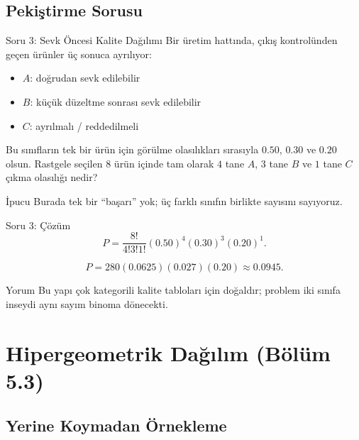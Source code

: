 \documentclass[light]{lutbeamer}
\begin{document}
\subsection{Pekiştirme Sorusu}

\begin{frame}{Soru 3: Sevk Öncesi Kalite Dağılımı}
    \small
    Bir üretim hattında, çıkış kontrolünden geçen ürünler üç sonuca ayrılıyor:
    \begin{itemize}
        \item \(A\): doğrudan sevk edilebilir
        \item \(B\): küçük düzeltme sonrası sevk edilebilir
        \item \(C\): ayrılmalı / reddedilmeli
    \end{itemize}

    Bu sınıfların tek bir ürün için görülme olasılıkları sırasıyla \(0.50\), \(0.30\) ve \(0.20\) olsun.
    Rastgele seçilen \(8\) ürün içinde tam olarak \(4\) tane \(A\), \(3\) tane \(B\) ve \(1\) tane \(C\) çıkma olasılığı nedir?

    \begin{block}{İpucu}
        Burada tek bir ``başarı'' yok; üç farklı sınıfın birlikte sayısını sayıyoruz.
    \end{block}
\end{frame}

\begin{frame}{Soru 3: Çözüm}
    \small
    \[
    P=\frac{8!}{4!3!1!}(0.50)^4(0.30)^3(0.20)^1.
    \]

    \[
    P=280(0.0625)(0.027)(0.20)\approx 0.0945.
    \]

    \begin{exampleblock}{Yorum}
        Bu yapı çok kategorili kalite tabloları için doğaldır; problem iki sınıfa inseydi aynı sayım binoma dönecekti.
    \end{exampleblock}
\end{frame}

\section{Hipergeometrik Dağılım (Bölüm 5.3)}
\subsection{Yerine Koymadan Örnekleme}
\end{document}
